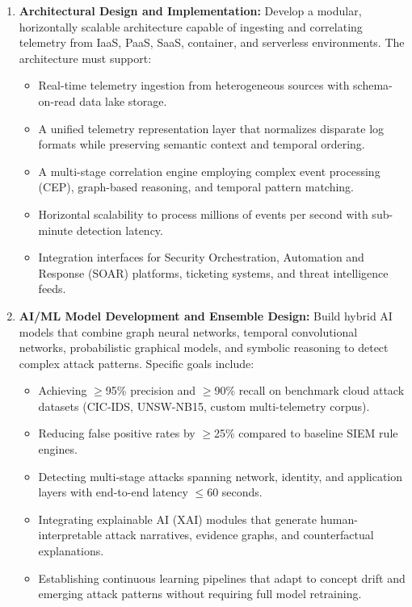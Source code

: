\begin{enumerate}[label=\textbf{O\arabic*}]
    \item \textbf{Architectural Design and Implementation:} Develop a modular, horizontally scalable architecture capable of ingesting and correlating telemetry from IaaS, PaaS, SaaS, container, and serverless environments. The architecture must support:
    \begin{itemize}
        \item Real-time telemetry ingestion from heterogeneous sources with schema-on-read data lake storage.
        \item A unified telemetry representation layer that normalizes disparate log formats while preserving semantic context and temporal ordering.
        \item A multi-stage correlation engine employing complex event processing (CEP), graph-based reasoning, and temporal pattern matching.
        \item Horizontal scalability to process millions of events per second with sub-minute detection latency.
        \item Integration interfaces for Security Orchestration, Automation and Response (SOAR) platforms, ticketing systems, and threat intelligence feeds.
    \end{itemize}
    
    \item \textbf{AI/ML Model Development and Ensemble Design:} Build hybrid AI models that combine graph neural networks, temporal convolutional networks, probabilistic graphical models, and symbolic reasoning to detect complex attack patterns. Specific goals include:
    \begin{itemize}
        \item Achieving $\geq$95\% precision and $\geq$90\% recall on benchmark cloud attack datasets (CIC-IDS, UNSW-NB15, custom multi-telemetry corpus).
        \item Reducing false positive rates by $\geq$25\% compared to baseline SIEM rule engines.
        \item Detecting multi-stage attacks spanning network, identity, and application layers with end-to-end latency $\leq$60 seconds.
        \item Integrating explainable AI (XAI) modules that generate human-interpretable attack narratives, evidence graphs, and counterfactual explanations.
        \item Establishing continuous learning pipelines that adapt to concept drift and emerging attack patterns without requiring full model retraining.
    \end{itemize}
    

\end{enumerate}
